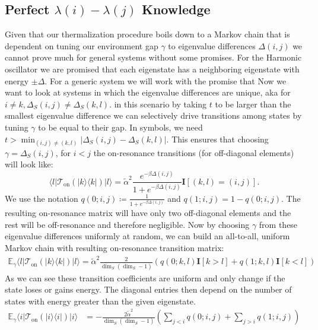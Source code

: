 \documentclass{article}
\newcommand{\on}{\text{on}}
\newcommand{\ket}[1]{|#1\rangle}
\newcommand{\bra}[1]{\langle #1|}
\newcommand{\ketbra}[2]{| #1\rangle\! \langle #2|}
\begin{document}
\subsection{Perfect $\lambda(i) - \lambda(j)$ Knowledge}
Given that our thermalization procedure boils down to a Markov chain that is dependent on tuning our environment gap $\gamma$ to eigenvalue differences $\Delta(i,j)$ we cannot prove much for general systems without some promises. For the Harmonic oscillator we are promised that each eigenstate has a neighboring eigenstate with energy $\pm \Delta$. For a generic system we will work with the promise that 
Now we want to look at systems in which the eigenvalue differences are unique, aka for $i \neq k, \Delta_S(i, j) \neq \Delta_S(k, l)$. in this scenario by taking $t$ to be larger than the smallest eigenvalue difference we can selectively drive transitions among states by tuning $\gamma$ to be equal to their gap. In symbols, we need $t > \min_{(i, j) \neq (k, l)} \left| \Delta_S(i, j) - \Delta_S(k,l)\right| $. This ensures that choosing $\gamma = \Delta_S(i,j)$, for $i < j$ the on-resonance transitions (for off-diagonal elements) will look like:
\begin{equation}
    \bra{l} \mathcal{T}_{\on}(\ketbra{k}{k}) \ket{l} = \widetilde{\alpha}^2 \frac{e^{-\beta \Delta(i,j)}}{1 + e^{-\beta \Delta(i, j)}} \mathbf{I}[(k,l) = (i, j)].
\end{equation}
We use the notation $q(0; i,j) \coloneqq \frac{1}{1 + e^{-\beta \Delta(i,j)}}$ and $q(1;i, j) = 1 - q(0;i,j)$.
The resulting on-resonance matrix will have only two off-diagonal elements and the rest will be off-resonance and therefore negligible. Now by choosing $\gamma$ from these eigenvalue differences uniformly at random, we can build an all-to-all, uniform Markov chain with resulting on-resonance transition matrix:
\begin{align}
    \mathbb{E}_{\gamma} \bra{l} \mathcal{T}_{\on}(\ketbra{k}{k}) \ket{l} = \widetilde{\alpha}^2 \frac{2}{\dim_S(\dim_S - 1)} \left(q(0; k, l) \mathbf{I}[k > l] + q(1; k,l) \mathbf{I}[k < l] \right)
\end{align}
As we can see these transition coefficients are uniform and only change if the state loses or gains energy. The diagonal entries then depend on the number of states with energy greater than the given eigenstate. 
\begin{align}
    \mathbb{E}_{\gamma} \bra{i} \mathcal{T}_{\on}(\ketbra{i}{i}) \ket{i} &= - \frac{2\widetilde{\alpha}^2}{\dim_S(\dim_S - 1)} \left(\sum_{j < i} q(0; i, j) + \sum_{j > i} q(1; i, j) \right)
\end{align}
\end{document}
